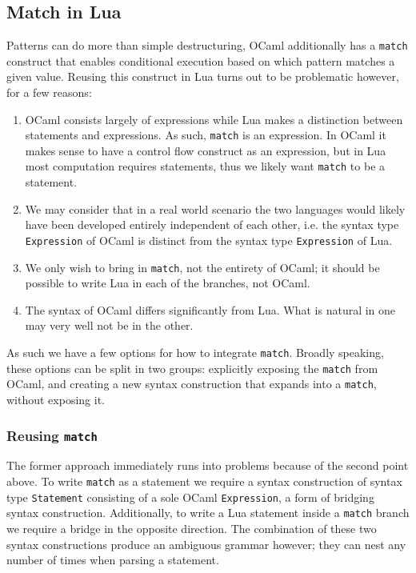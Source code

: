 \documentclass{kththesis}
\begin{document}
\subsection{Match in Lua} \label{sec:match-in-lua}

Patterns can do more than simple destructuring, OCaml additionally has a \texttt{match} construct that enables conditional execution based on which pattern matches a given value. Reusing this construct in Lua turns out to be problematic however, for a few reasons:

\begin{enumerate}
\item OCaml consists largely of expressions while Lua makes a distinction between statements and expressions. As such, \texttt{match} is an expression. In OCaml it makes sense to have a control flow construct as an expression, but in Lua most computation requires statements, thus we likely want \texttt{match} to be a statement.

\item We may consider that in a real world scenario the two languages would likely have been developed entirely independent of each other, i.e. the syntax type \texttt{Expression} of OCaml is distinct from the syntax type \texttt{Expression} of Lua.

\item We only wish to bring in \texttt{match}, not the entirety of OCaml; it should be possible to write Lua in each of the branches, not OCaml.

\item The syntax of OCaml differs significantly from Lua. What is natural in one may very well not be in the other.
\end{enumerate}

As such we have a few options for how to integrate \texttt{match}. Broadly speaking, these options can be split in two groups: explicitly exposing the \texttt{match} from OCaml, and creating a new syntax construction that expands into a \texttt{match}, without exposing it.

\subsubsection{Reusing \texttt{match}}

The former approach immediately runs into problems because of the second point above. To write \texttt{match} as a statement we require a syntax construction of syntax type \texttt{Statement} consisting of a sole OCaml \texttt{Expression}, a form of bridging syntax construction. Additionally, to write a Lua statement inside a \texttt{match} branch we require a bridge in the opposite direction. The combination of these two syntax constructions produce an ambiguous grammar however; they can nest any number of times when parsing a statement.
\end{document}

